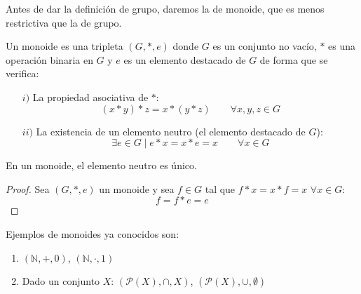 Antes de dar la definición de grupo, daremos la de monoide, que es menos restrictiva que la de grupo.

\begin{definicion}[Monoide]
    Un monoide es una tripleta $(G,\ast,e)$ donde $G$ es un conjunto no vacío, $\ast$ es una operación binaria en $G$ y $e$ es un elemento destacado de $G$ de forma que se verifica:
    \begin{enumerate}
        \item[$i)$] La propiedad asociativa de $\ast$:
            \begin{equation*}
                (x\ast y) \ast z = x \ast (y\ast z) \qquad \forall x,y,z\in G
            \end{equation*}
        \item[$ii)$] La existencia de un elemento neutro (el elemento destacado de $G$):
            \begin{equation*}
                \exists e\in G \mid e\ast x = x\ast e = x \qquad \forall x\in G
            \end{equation*}
    \end{enumerate}
\end{definicion}

\begin{prop}\label{prop:neutro_unico_monoide}
    En un monoide, el elemento neutro es único.
    \begin{proof}
        Sea $(G,\ast,e)$ un monoide y sea $f\in G$ tal que $f\ast x = x\ast f = x$ $\forall x\in G$:
        \begin{equation*}
            f = f\ast e = e
        \end{equation*}
    \end{proof}
\end{prop}

\begin{ejemplo}
    Ejemplos de monoides ya conocidos son:
    \begin{enumerate}
        \item $(\mathbb{N}, +, 0)$, $(\mathbb{N}, \cdot, 1)$
        \item Dado un conjunto $X$: $(\mathcal{P}(X), \cap, X)$, $(\mathcal{P}(X), \cup, \emptyset )$
    \end{enumerate}
\end{ejemplo}

